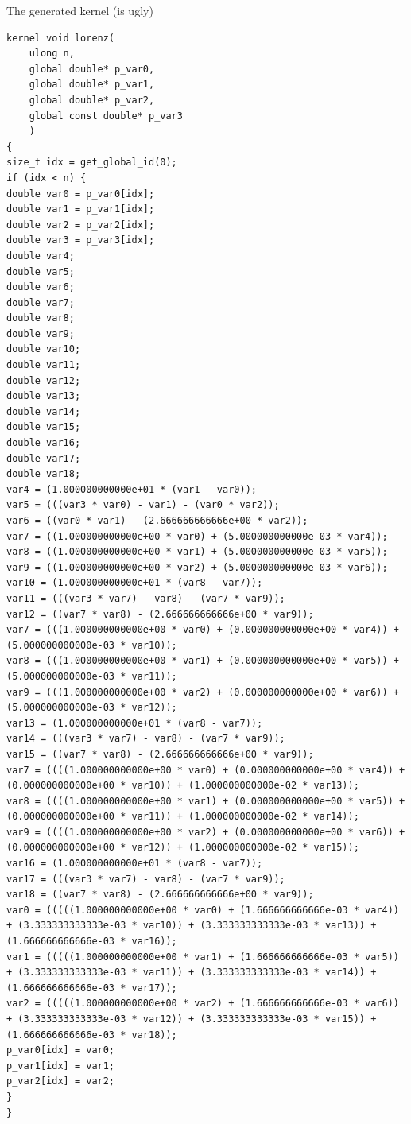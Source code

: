 \documentclass[@BEAMER_OPTIONS@]{beamer}
\begin{document}
\begin{frame}[fragile,shrink=50]{The generated kernel (is ugly)}
    \begin{exampleblock}{}
        \begin{lstlisting}
kernel void lorenz(
	ulong n,
	global double* p_var0,
	global double* p_var1,
	global double* p_var2,
	global const double* p_var3
	)
{
size_t idx = get_global_id(0);
if (idx < n) {
double var0 = p_var0[idx];
double var1 = p_var1[idx];
double var2 = p_var2[idx];
double var3 = p_var3[idx];
double var4;
double var5;
double var6;
double var7;
double var8;
double var9;
double var10;
double var11;
double var12;
double var13;
double var14;
double var15;
double var16;
double var17;
double var18;
var4 = (1.000000000000e+01 * (var1 - var0));
var5 = (((var3 * var0) - var1) - (var0 * var2));
var6 = ((var0 * var1) - (2.666666666666e+00 * var2));
var7 = ((1.000000000000e+00 * var0) + (5.000000000000e-03 * var4));
var8 = ((1.000000000000e+00 * var1) + (5.000000000000e-03 * var5));
var9 = ((1.000000000000e+00 * var2) + (5.000000000000e-03 * var6));
var10 = (1.000000000000e+01 * (var8 - var7));
var11 = (((var3 * var7) - var8) - (var7 * var9));
var12 = ((var7 * var8) - (2.666666666666e+00 * var9));
var7 = (((1.000000000000e+00 * var0) + (0.000000000000e+00 * var4)) + (5.000000000000e-03 * var10));
var8 = (((1.000000000000e+00 * var1) + (0.000000000000e+00 * var5)) + (5.000000000000e-03 * var11));
var9 = (((1.000000000000e+00 * var2) + (0.000000000000e+00 * var6)) + (5.000000000000e-03 * var12));
var13 = (1.000000000000e+01 * (var8 - var7));
var14 = (((var3 * var7) - var8) - (var7 * var9));
var15 = ((var7 * var8) - (2.666666666666e+00 * var9));
var7 = ((((1.000000000000e+00 * var0) + (0.000000000000e+00 * var4)) + (0.000000000000e+00 * var10)) + (1.000000000000e-02 * var13));
var8 = ((((1.000000000000e+00 * var1) + (0.000000000000e+00 * var5)) + (0.000000000000e+00 * var11)) + (1.000000000000e-02 * var14));
var9 = ((((1.000000000000e+00 * var2) + (0.000000000000e+00 * var6)) + (0.000000000000e+00 * var12)) + (1.000000000000e-02 * var15));
var16 = (1.000000000000e+01 * (var8 - var7));
var17 = (((var3 * var7) - var8) - (var7 * var9));
var18 = ((var7 * var8) - (2.666666666666e+00 * var9));
var0 = (((((1.000000000000e+00 * var0) + (1.666666666666e-03 * var4)) + (3.333333333333e-03 * var10)) + (3.333333333333e-03 * var13)) + (1.666666666666e-03 * var16));
var1 = (((((1.000000000000e+00 * var1) + (1.666666666666e-03 * var5)) + (3.333333333333e-03 * var11)) + (3.333333333333e-03 * var14)) + (1.666666666666e-03 * var17));
var2 = (((((1.000000000000e+00 * var2) + (1.666666666666e-03 * var6)) + (3.333333333333e-03 * var12)) + (3.333333333333e-03 * var15)) + (1.666666666666e-03 * var18));
p_var0[idx] = var0;
p_var1[idx] = var1;
p_var2[idx] = var2;
}
}
        \end{lstlisting}
    \end{exampleblock}
\end{frame}

\note{ }
\end{document}
